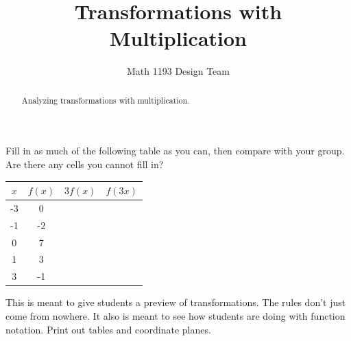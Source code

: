 \documentclass[noauthor]{ximera}
\title{Transformations with Multiplication}
\author{Math 1193 Design Team}
\begin{document}
\begin{abstract}
    Analyzing transformations with multiplication.
\end{abstract}
\maketitle

Fill in as much of the following table as you can, then 
compare with your group. Are there any cells you cannot fill in?

\begin{center}
\begin{tabular}{|c|c|c|c|} 
 \hline
 \(x\) & \(f(x)\) & \(3f(x)\) & \(f(3x)\) \\
 \hline\hline
 -3 & 0 &  &  \\ 
 \hline
 -1 & -2 &  &  \\
 \hline
 0 & 7 &  &  \\
 \hline
 1 & 3 &  &  \\
 \hline
 3 & -1 &  &  \\
 \hline
\end{tabular}
\end{center}

\begin{instructorNotes}
This is meant to give students a preview of transformations. The rules don't
just come from nowhere. It also is meant to see how students are doing
with function notation. Print out tables and coordinate planes.
\end{instructorNotes}
\end{document}
